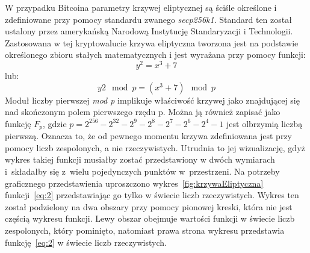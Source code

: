 \documentclass[12pt, oneside, final, openany]{mgr}
\begin{document}
\indent W przypadku Bitcoina parametry krzywej eliptycznej są ściśle określone i zdefiniowane przy pomocy standardu zwanego \textit{secp256k1}. Standard ten został ustalony przez amerykańską Narodową Instytucję Standaryzacji i Technologii. Zastosowana w tej kryptowalucie krzywa eliptyczna tworzona jest na podstawie określonego zbioru stałych matematycznych i jest wyrażana przy pomocy funkcji:
\begin{equation}
  y^2 = x^3 + 7 
\end{equation} 
\label{eq:2}
lub:
\begin{equation} 
\label{eq:3}
  y2 \mod p = (x^3 + 7) \mod p
\end{equation}
Moduł liczby pierwszej \textit{mod p} implikuje właściwość krzywej jako znajdującej się nad skończonym polem pierwszego rzędu p. Można ją również zapisać jako funkcję $F_p$, gdzie $p = 2^{256} - 2^{32} - 2^9 - 2^8 - 2^7 - 2^6 - 2^4 - 1$ jest olbrzymią liczbą pierwszą. Oznacza to, że od pewnego momentu krzywa zdefiniowana jest przy pomocy liczb zespolonych, a nie rzeczywistych. Utrudnia to jej wizualizację, gdyż wykres takiej funkcji musiałby zostać przedstawiony w dwóch wymiarach i~składałby się z~wielu pojedynczych punktów w~przestrzeni. Na potrzeby graficznego przedstawienia uproszczono wykres~\ref{fig:krzywaEliptyczna} funkcji~\ref{eq:2} przedstawiając go tylko w świecie liczb rzeczywistych. Wykres ten został podzielony na dwa obszary przy pomocy pionowej kreski, która nie jest częścią wykresu funkcji. Lewy obszar obejmuje wartości funkcji w świecie liczb zespolonych, który pominięto, natomiast prawa strona wykresu przedstawia funkcję~\ref{eq:2} w świecie liczb rzeczywistych.
\end{document}
